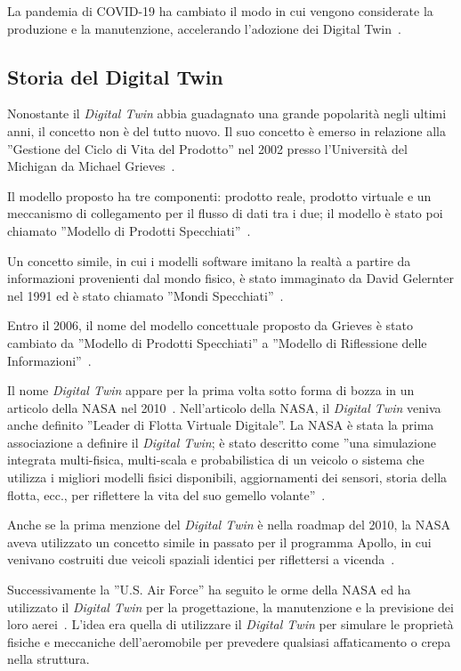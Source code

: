 La pandemia di COVID-19 ha cambiato il modo in cui vengono considerate la produzione e la manutenzione, accelerando l'adozione dei Digital Twin~\cite{Covid_DT}.

\subsection{Storia del Digital Twin}
Nonostante il \emph{Digital Twin} abbia guadagnato una grande popolarità negli ultimi anni, il concetto non è del tutto nuovo. Il suo concetto è emerso in relazione alla ”Gestione del Ciclo di Vita del Prodotto” nel 2002 presso l'Università del Michigan da Michael Grieves~\cite{Origin_DT}.

Il modello proposto ha tre componenti: prodotto reale, prodotto virtuale e un meccanismo di collegamento per il flusso di dati tra i due; il modello è stato poi chiamato ”Modello di Prodotti Specchiati”~\cite{Spazi_specchiati}. 

Un concetto simile, in cui i modelli software imitano la realtà a partire da informazioni provenienti dal mondo fisico, è stato immaginato da David Gelernter nel 1991 ed è stato chiamato ”Mondi Specchiati”~\cite{Mondi_specchiati}.

Entro il 2006, il nome del modello concettuale proposto da Grieves è stato cambiato da ”Modello di Prodotti Specchiati” a ”Modello di Riflessione delle Informazioni”~\cite{Origin_concept_DT, PLM_DT}.

Il nome \emph{Digital Twin} appare per la prima volta sotto forma di bozza in un articolo della NASA nel 2010~\cite{NASA2}. Nell'articolo della NASA, il \emph{Digital Twin} veniva anche definito ”Leader di Flotta Virtuale Digitale”. La NASA è stata la prima associazione a definire il \emph{Digital Twin}; è stato descritto come ”una simulazione integrata multi-fisica, multi-scala e probabilistica di un veicolo o sistema che utilizza i migliori modelli fisici disponibili, aggiornamenti dei sensori, storia della flotta, ecc., per riflettere la vita del suo gemello volante”~\cite{NASA}.

Anche se la prima menzione del \emph{Digital Twin} è nella roadmap del 2010, la NASA aveva utilizzato un concetto simile in passato per il programma Apollo, in cui venivano costruiti due veicoli spaziali identici per riflettersi a vicenda~\cite{Apollo}.

Successivamente la ”U.S. Air Force” ha seguito le orme della NASA ed ha utilizzato il \emph{Digital Twin} per la progettazione, la manutenzione e la previsione dei loro aerei~\cite{Air_force}. L'idea era quella di utilizzare il \emph{Digital Twin} per simulare le proprietà fisiche e meccaniche dell'aeromobile per prevedere qualsiasi affaticamento o crepa nella struttura.

